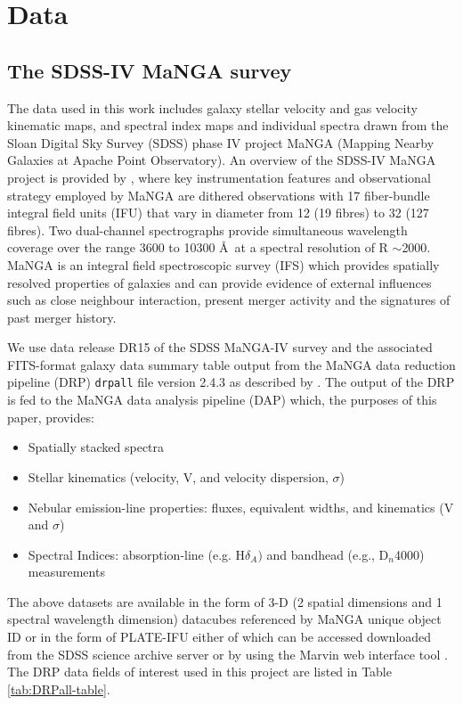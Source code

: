 \section{Data}
\label{sec:data}

\subsection{The SDSS-IV MaNGA survey}
\label{sec:MaNGA}
The data used in this work includes galaxy stellar velocity and gas velocity kinematic maps, and spectral index maps and individual spectra drawn from the Sloan Digital Sky Survey (SDSS) phase IV project MaNGA (Mapping Nearby Galaxies at Apache Point Observatory). An overview of the SDSS-IV MaNGA project is provided by \citet{2015ApJ...798....7B}, where key instrumentation features and observational strategy employed by MaNGA are dithered observations with 17 fiber-bundle integral
field units (IFU) that vary in diameter from 12 (19 fibres) to 32 (127 fibres). Two dual-channel spectrographs provide
simultaneous wavelength coverage over the range 3600 to 10300 \AA\ at a spectral resolution of R $\sim$2000. MaNGA is an integral field spectroscopic survey (IFS) which provides spatially resolved properties of galaxies and can provide evidence of external influences such as close neighbour interaction, present merger activity and the signatures of past merger history. 

We use data release DR15 of the SDSS MaNGA-IV survey \citep{2019ApJS..240...23A} and the associated FITS-format galaxy data summary table output from the MaNGA data reduction pipeline (DRP) \texttt{drpall} file version 2.4.3 as described by \citet{2016AJ....152...83L}. The output of the DRP is fed to the MaNGA data analysis pipeline (DAP) which,  the purposes of this paper, provides:
\begin{itemize}
    \item Spatially stacked spectra
    \item Stellar kinematics (velocity, V, and velocity dispersion, $\sigma$)
    \item Nebular emission-line properties: fluxes, equivalent widths, and kinematics (V and $\sigma$)
    \item Spectral Indices: absorption-line (e.g.  H$\delta_A)$ and bandhead (e.g., D$_n$4000) measurements
\end{itemize}

The above datasets are available in the form of 3-D (2 spatial dimensions and 1 spectral wavelength dimension) datacubes referenced by MaNGA unique object ID or in the form of PLATE-IFU either of which can be accessed downloaded from the SDSS science archive server or by using the Marvin web interface tool \citep{2018arXiv181203833C}. The DRP data fields of interest used in this project are listed in Table \ref{tab:DRPall-table}.

